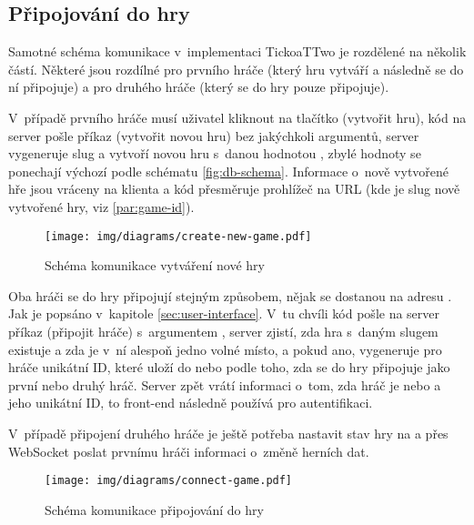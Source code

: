 \subsection{Připojování do hry}

Samotné schéma komunikace v~implementaci TickoaTTwo je rozdělené na několik
částí. Některé jsou rozdílné pro prvního hráče (který hru vytváří a následně se
do ní připojuje) a pro druhého hráče (který se do hry pouze připojuje).

V~případě prvního hráče musí uživatel kliknout na tlačítko 
(vytvořit hru), kód na server pošle příkaz  (vytvořit novou
hru) bez jakýchkoli argumentů, server vygeneruje slug a vytvoří novou hru
s~danou hodnotou , zbylé hodnoty se ponechají výchozí podle schématu
\ref{fig:db-schema}. Informace o~nově vytvořené hře jsou vráceny na klienta a
kód přesměruje prohlížeč na URL  (kde 
je slug nově vytvořené hry, viz \ref{par:game-id}).

\begin{figure}[h]
    \centering
    \texttt{[image: img/diagrams/create-new-game.pdf]}
    \caption[Schéma komunikace vytváření nové hry]{Schéma komunikace vytváření nové hry\footnotemark}
    \label{fig:create-new-game}
\end{figure}


Oba hráči se do hry připojují stejným způsobem, nějak se dostanou na adresu
. Jak je popsáno v~kapitole \ref{sec:user-interface}. V~tu chvíli
kód pošle na server příkaz  (připojit hráče) s~argumentem
, server zjistí, zda hra s~daným slugem existuje a zda je v~ní alespoň
jedno volné místo, a pokud ano, vygeneruje pro hráče unikátní ID, které uloží
do  nebo  podle toho, zda se do hry připojuje jako první
nebo druhý hráč. Server zpět vrátí informaci o~tom, zda hráč je 
nebo  a jeho unikátní ID, to front-end následně používá pro
autentifikaci.

V~případě připojení druhého hráče je ještě potřeba nastavit stav hry na
 a přes WebSocket poslat prvnímu hráči informaci o~změně
herních dat.

\begin{figure}[h]
    \centering
    \texttt{[image: img/diagrams/connect-game.pdf]}\hspace*{80px}
    \caption[Schéma komunikace připojování do hry]{Schéma komunikace připojování do hry\footnotemark}
    \label{fig:connect-game}
\end{figure}

